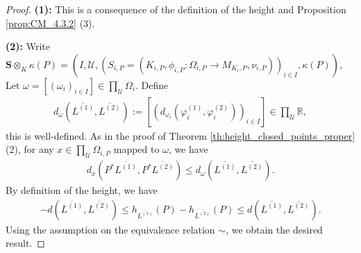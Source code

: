 \documentclass [11pt,reqno]{amsart}
\def\bR{{\mathbb{R}}}
\newcommand{\1}{\mathmybb{1}}
\def\cU{{\mathcal{U}}}
\begin{document}
\begin{proof}
\textbf{(1):} This is a consequence of the definition of the height and Proposition \ref{prop:CM_4.3.2} (3).

\textbf{(2):} Write $\mathbf{S}\otimes_{K}\kappa(P)= (I,\cU,(S_{i,P}=(K_{i,P},\phi_{i,P}:\Omega_{i,P}\to M_{K_{i},P},\nu_{i,P}))_{i\in I},\kappa(P))$, Let $\omega=[(\omega_{i})_{i\in I}]\in \prod_{\cU}\Omega_{i}$. Define
\begin{align*}
d_{\omega}(\overline{L^{(1)}},\overline{L^{(2)}}) := \left[\left(d_{\omega_{i}}(\varphi^{(1)}_{i},\varphi_{i}^{(2)})\right)_{i\in I}\right] \in  \prod_{\cU}\bR,
\end{align*}
this is well-defined. As in the proof of Theorem \ref{th:height_closed_points_proper} (2), for any $x\in \prod_{\cU}\Omega_{i,P}$ mapped to $\omega$, we have
\begin{align*}
d_{x}(P^{\ast}\overline{L^{(1)}},P^{\ast}\overline{L^{(2)}}) \leq d_{\omega}(\overline{L^{(1)}},\overline{L^{(2)}}).
\end{align*}
By definition of the height, we have
\begin{align*}
-d(\overline{L^{(1)}},\overline{L^{(2)}})\leq h_{\overline{L^{(1)}}}(P)-h_{\overline{L^{(2)}}}(P) \leq d(\overline{L^{(1)}},\overline{L^{(2)}}).
\end{align*}
Using the assumption on the equivalence relation $\sim$, we obtain the desired result.
\end{proof}
\end{document}
